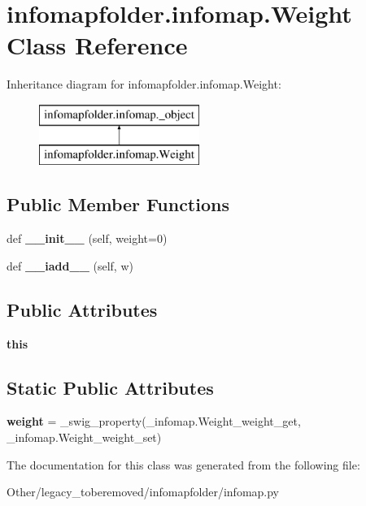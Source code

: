 \hypertarget{classinfomapfolder_1_1infomap_1_1Weight}{}\section{infomapfolder.\+infomap.\+Weight Class Reference}
\label{classinfomapfolder_1_1infomap_1_1Weight}
Inheritance diagram for infomapfolder.\+infomap.\+Weight\+:\begin{figure}[H]
\begin{center}
\leavevmode
\includegraphics[height=2.000000cm]{classinfomapfolder_1_1infomap_1_1Weight}
\end{center}
\end{figure}
\subsection*{Public Member Functions}
\begin{DoxyCompactItemize}
\item 
\mbox{\label{classinfomapfolder_1_1infomap_1_1Weight_a91ee0b5238180660ec798996bbf7781b}} 
def {\bfseries \+\_\+\+\_\+init\+\_\+\+\_\+} (self, weight=0)
\item 
\mbox{\label{classinfomapfolder_1_1infomap_1_1Weight_ad9f57dda4439a244d102a7209d25b90a}} 
def {\bfseries \+\_\+\+\_\+iadd\+\_\+\+\_\+} (self, w)
\end{DoxyCompactItemize}
\subsection*{Public Attributes}
\begin{DoxyCompactItemize}
\item 
\mbox{\label{classinfomapfolder_1_1infomap_1_1Weight_a036ed6a3578f2a017e6243fb6c81fc45}} 
{\bfseries this}
\end{DoxyCompactItemize}
\subsection*{Static Public Attributes}
\begin{DoxyCompactItemize}
\item 
\mbox{\label{classinfomapfolder_1_1infomap_1_1Weight_a5b137760ff204cefbee1b3f9dcf830c9}} 
{\bfseries weight} = \+\_\+swig\+\_\+property(\+\_\+infomap.\+Weight\+\_\+weight\+\_\+get, \+\_\+infomap.\+Weight\+\_\+weight\+\_\+set)
\end{DoxyCompactItemize}


The documentation for this class was generated from the following file\+:\begin{DoxyCompactItemize}
\item 
Other/legacy\+\_\+toberemoved/infomapfolder/infomap.\+py\end{DoxyCompactItemize}
